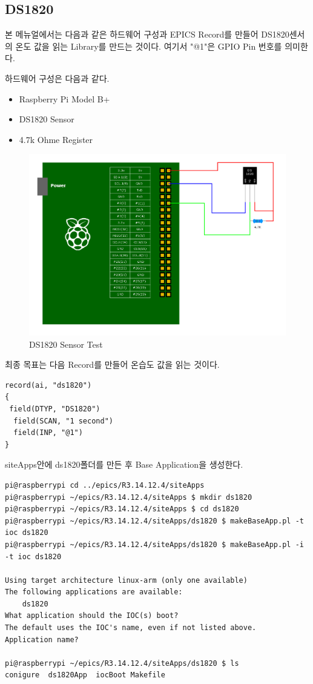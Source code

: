 \documentclass[11pt
  , a4paper
  , article
  , oneside
]{memoir}
\begin{document}
\subsection{DS1820}
본 메뉴얼에서는 다음과 같은 하드웨어 구성과 EPICS Record를 만들어 DS1820센서의 온도 값을 읽는 Library를 만드는 것이다. 여기서 "@1"은 GPIO Pin 번호를 의미한다.

하드웨어 구성은 다음과 같다.
\begin{itemize}
\item Raspberry Pi Model B+
\item DS1820 Sensor
\item 4.7k Ohme Register
\end{itemize}
\begin{figure}[!htb]
\centering
\includegraphics[width=1\textwidth]{./images/raspberry/ds1820_test.png}
\caption{DS1820 Sensor Test}
\label{fig:ds1820_epics_test}
\end{figure}
최종 목표는 다음 Record를 만들어 온습도 값을 읽는 것이다.
\begin{lstlisting}[style=termstyle]
record(ai, "ds1820")       
{
 field(DTYP, "DS1820")
  field(SCAN, "1 second")
  field(INP, "@1")
}
\end{lstlisting}
siteApps안에 ds1820폴더를 만든 후 Base Application을 생성한다.
\begin{lstlisting}[style=termstyle]
pi@raspberrypi cd ../epics/R3.14.12.4/siteApps
pi@raspberrypi ~/epics/R3.14.12.4/siteApps $ mkdir ds1820
pi@raspberrypi ~/epics/R3.14.12.4/siteApps $ cd ds1820
pi@raspberrypi ~/epics/R3.14.12.4/siteApps/ds1820 $ makeBaseApp.pl -t ioc ds1820
pi@raspberrypi ~/epics/R3.14.12.4/siteApps/ds1820 $ makeBaseApp.pl -i -t ioc ds1820

Using target architecture linux-arm (only one available)
The following applications are available:
    ds1820
What application should the IOC(s) boot?
The default uses the IOC's name, even if not listed above.
Application name?

pi@raspberrypi ~/epics/R3.14.12.4/siteApps/ds1820 $ ls
conigure  ds1820App  iocBoot Makefile
\end{lstlisting}
\end{document}
